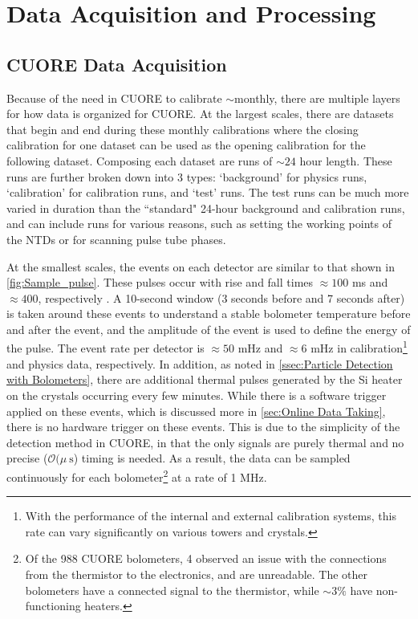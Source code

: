 \chapter{Data Acquisition and Processing}
\label{ch:Data Acquisition and Processing}

\section{CUORE Data Acquisition}
Because of the need in CUORE to calibrate $\sim$monthly, there are multiple layers for how data is organized for CUORE.
At the largest scales, there are datasets that begin and end during these monthly calibrations where the closing calibration for one dataset can be used as the opening calibration for the following dataset.
Composing each dataset are runs of $\sim24$ hour length.
These runs are further broken down into 3 types: `background' for physics runs, `calibration' for calibration runs, and `test' runs.
The test runs can be much more varied in duration than the ``standard" 24-hour background and calibration runs, and can include runs for various reasons, such as setting the working points of the NTDs or for scanning pulse tube phases.

At the smallest scales, the events on each detector are similar to that shown in \autoref{fig:Sample_pulse}.
These pulses occur with rise and fall times $\approx100$ ms and $\approx400$, respectively \cite{Alduino:2017ehq}.
A 10-second window (3 seconds before and 7 seconds after) is taken around these events to understand a stable bolometer temperature before and after the event, and the amplitude of the event is used to define the energy of the pulse.
The event rate per detector is $\approx 50$ mHz and $\approx6$ mHz in calibration\footnote{With the performance of the internal and external calibration systems, this rate can vary significantly on various towers and crystals.} and physics data, respectively.
In addition, as noted in \autoref{ssec:Particle Detection with Bolometers}, there are additional thermal pulses generated by the Si heater on the crystals occurring every few minutes.
While there is a software trigger applied on these events, which is discussed more in \autoref{sec:Online Data Taking}, there is no hardware trigger on these events.
This is due to the simplicity of the detection method in CUORE, in that the only signals are purely thermal and no precise ($\mathcal{O}(\mu~\textrm{s}$) timing is needed.
As a result, the data can be sampled continuously for each bolometer\footnote{Of the 988 CUORE bolometers, 4 observed an issue with the connections from the thermistor to the electronics, and are unreadable.
The other bolometers have a connected signal to the thermistor, while $\sim3\%$ have non-functioning heaters.} at a rate of 1 MHz.

